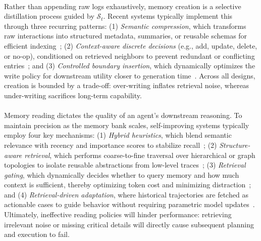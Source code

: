 \paragraph{} Rather than appending raw logs exhaustively, memory creation is a selective distillation process guided by $\mathcal{S}_t$. Recent systems typically implement this through three recurring patterns: (1) \emph{Semantic compression}, which transforms raw interactions into structured metadata, summaries, or reusable schemas for efficient indexing~\citep{salama2025meminsightautonomousmemoryaugmentation, wang2024agentworkflowmemory, ouyang2025reasoningbankscalingagentselfevolving}; (2) \emph{Context-aware discrete decisions} (e.g., add, update, delete, or no-op), conditioned on retrieved neighbors to prevent redundant or conflicting entries~\citep{chhikara2025mem0buildingproductionreadyai, xu2025amemagenticmemoryllm}; and (3) \emph{Controlled boundary insertion}, which dynamically optimizes the write policy for downstream utility closer to generation time~\citep{zhang2025memgenweavinggenerativelatent}. Across all designs, creation is bounded by a trade-off: over-writing inflates retrieval noise, whereas under-writing sacrifices long-term capability.



\paragraph{}  Memory reading dictates the quality of an agent's downstream reasoning. To maintain precision as the memory bank scales, self-improving systems typically employ four key mechanisms: (1) \emph{Hybrid heuristics}, which blend semantic relevance with recency and importance scores to stabilize recall~\citep{park2023generativeagentsinteractivesimulacra}; (2) \emph{Structure-aware retrieval}, which performs coarse-to-fine traversal over hierarchical or graph topologies to isolate reusable abstractions from low-level traces~\citep{zhang2025gmemorytracinghierarchicalmemory}; (3) \emph{Retrieval gating}, which dynamically decides whether to query memory and how much context is sufficient, thereby optimizing token cost and minimizing distraction~\citep{wang2025scmenhancinglargelanguage}; and (4) \emph{Retrieval-driven adaptation}, where historical trajectories are fetched as actionable cases to guide behavior without requiring parametric model updates~\citep{zhou2025mementofinetuningllmagents}. Ultimately, ineffective reading policies will hinder performance: retrieving irrelevant noise or missing critical details will directly cause subsequent planning and execution to fail.



